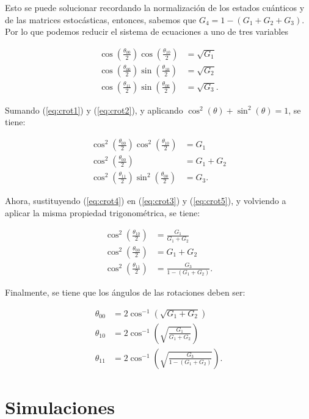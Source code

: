 Esto se puede solucionar recordando la normalización de los estados cuánticos y de las matrices estocásticas, entonces, sabemos que $G_4 = 1 - (G_1 + G_2 + G_3)$. Por lo que podemos reducir el sistema de ecuaciones a uno de tres variables

\begin{align}
    \cos(\frac{\theta_{00}}{2}) \cos(\frac{\theta_{10}}{2}) &= \sqrt{G_1}
    \label{eq:crot1} \\
    \cos(\frac{\theta_{00}}{2}) \sin(\frac{\theta_{10}}{2}) &= \sqrt{G_2}
    \label{eq:crot2} \\
    \cos(\frac{\theta_{11}}{2}) \sin(\frac{\theta_{00}}{2}) &= \sqrt{G_3} .
\end{align}

Sumando (\ref{eq:crot1}) y (\ref{eq:crot2}), y aplicando $\cos^2(\theta) + \sin^2(\theta) = 1$, se tiene:

\begin{align}
    \cos^2(\frac{\theta_{00}}{2}) \cos^2(\frac{\theta_{10}}{2}) &= G_1
    \label{eq:crot3} \\
    \cos^2(\frac{\theta_{00}}{2}) &= G_1 + G_2
    \label{eq:crot4} \\
    \cos^2(\frac{\theta_{11}}{2}) \sin^2(\frac{\theta_{00}}{2}) &= G_3 .
    \label{eq:crot5}
\end{align}

Ahora, sustituyendo (\ref{eq:crot4}) en (\ref{eq:crot3}) y (\ref{eq:crot5}), y volviendo a aplicar la misma propiedad trigonométrica, se tiene:

\begin{align}
    \cos^2(\frac{\theta_{10}}{2}) &= \frac{G_1}{G_1 + G_2} \\
    \cos^2(\frac{\theta_{00}}{2}) &= G_1 + G_2 \\
    \cos^2(\frac{\theta_{11}}{2}) &= \frac{G_3}{1-(G_1 + G_2)} .
\end{align}

Finalmente, se tiene que los ángulos de las rotaciones deben ser:

\begin{align}
    \theta_{00} &= 2 \cos^{-1}\left(\sqrt{G_1 + G_2}\right) \\
    \theta_{10} &= 2 \cos^{-1}\left(\sqrt{\frac{G_1}{G_1 + G_2}}\right) \\
    \theta_{11} &= 2 \cos^{-1}\left(\sqrt{\frac{G_3}{1 - (G_1 + G_2)}}\right) .
\end{align}

\section{Simulaciones}

